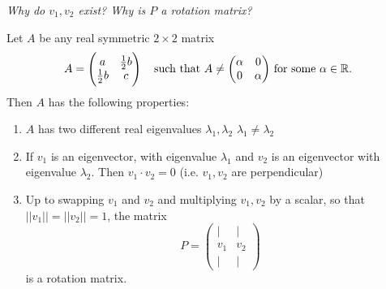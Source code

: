 \documentclass[10pt]{scrartcl}
\begin{document}
\emph{Why do $v_1,v_2$ exist? Why is $P$ a rotation matrix? }




\begin{theorem}
Let $A$ be any real symmetric $2 \times 2$ matrix 
\[
  A = \begin{pmatrix}
 a & \frac{1}{2}b\\ \frac{1}{2}b & c	
 \end{pmatrix}\quad \mbox{such that $A \neq \begin{pmatrix}
 \alpha & 0 \\ 0 & \alpha	
 \end{pmatrix}$ for some $\alpha \in\mathbb{R}$. }
\]
Then $A$ has the following properties: 
\begin{enumerate}
\item $A$ has two different real eigenvalues $\lambda_1, \lambda_2\,\,\lambda_1 \neq \lambda_2$
\item 	If $v_1$ is an eigenvector, with eigenvalue $\lambda_1$ and $v_2$ is an eigenvector with eigenvalue $\lambda_2$. Then $v_1\cdot v_2 = 0$ (i.e. $v_1,v_2$ are perpendicular)
\item Up to swapping $v_1$ and $v_2$ and multiplying $v_1,v_2$ by a scalar, so that $||v_1|| = ||v_2|| = 1$, the matrix 
\[
  P = \begin{pmatrix}
 | & | \\
 v_1 & v_2\\ 
 | & |	
 \end{pmatrix}
\]
is a rotation matrix.
\end{enumerate}
\end{theorem}
\end{document}
